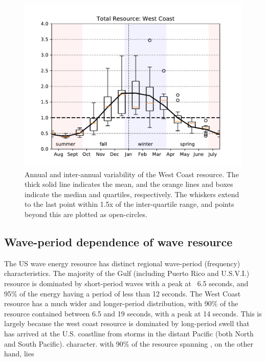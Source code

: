 \begin{figure}[ht]
  \centering
  \includegraphics[width=\textwidth]{../fig/AnnualVar01.wc.pdf}
  \caption[West Coast resource variability.]{Annual and inter-annual variability of the West Coast resource. The thick solid line indicates the mean, and the orange lines and boxes indicate the median and quartiles, respectively. The whiskers extend to the last point within 1.5x of the inter-quartile range, and points beyond this are plotted as open-circles.}
  \label{fig:wc-variability}
\end{figure}

\subsection{Wave-period dependence of wave resource}

The US wave energy resource has distinct regional wave-period (frequency) characteristics. The majority of the Gulf (including Puerto Rico and U.S.V.I.) resource is dominated by short-period waves with a peak at ~6.5 seconds, and 95\% of the energy having a period of less than 12 seconds. The West Coast resource has a much wider and longer-period distribution, with 90\% of the resource contained between 6.5 and 19 seconds, with a peak at 14 seconds. This is largely because the west coast resource is dominated by long-period swell that has arrived at the U.S. coastline from storms in the distant Pacific (both North and South Pacific). character.  with 90\% of the resource spanning , on the other hand, lies 


